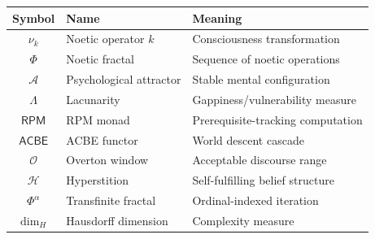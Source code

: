 \documentclass[11pt,twoside]{book}
\renewcommand{\arraystretch}{1.2}
\newcommand{\noe}[1]{\nu_{#1}}
\newcommand{\Frac}{\Phi}
\newcommand{\TransFrac}[1]{\Phi^{#1}}
\newcommand{\RPM}{\mathsf{RPM}}
\newcommand{\ACBE}{\mathsf{ACBE}}
\newcommand{\HausdorffDim}{\dim_H}
\newcommand{\Lacunarity}{\Lambda}
\newcommand{\PsychAttractor}{\mathcal{A}}
\newcommand{\Overton}{\mathcal{O}}
\newcommand{\Hyperstition}{\mathcal{H}}
\theoremstyle{definition}
\theoremstyle{plain}
\theoremstyle{remark}
\begin{document}
\begin{center}
\renewcommand{\arraystretch}{1.2}
\begin{longtable}{c|l|l}
\toprule
\textbf{Symbol} & \textbf{Name} & \textbf{Meaning} \\
\midrule
\endhead
$\noe{k}$ & Noetic operator $k$ & Consciousness transformation \\
$\Frac$ & Noetic fractal & Sequence of noetic operations \\
$\PsychAttractor$ & Psychological attractor & Stable mental configuration \\
$\Lacunarity$ & Lacunarity & Gappiness/vulnerability measure \\
$\RPM$ & RPM monad & Prerequisite-tracking computation \\
$\ACBE$ & ACBE functor & World descent cascade \\
$\Overton$ & Overton window & Acceptable discourse range \\
$\Hyperstition$ & Hyperstition & Self-fulfilling belief structure \\
$\TransFrac{\alpha}$ & Transfinite fractal & Ordinal-indexed iteration \\
$\HausdorffDim$ & Hausdorff dimension & Complexity measure \\
\bottomrule
\end{longtable}
\end{center}

\end{document}
